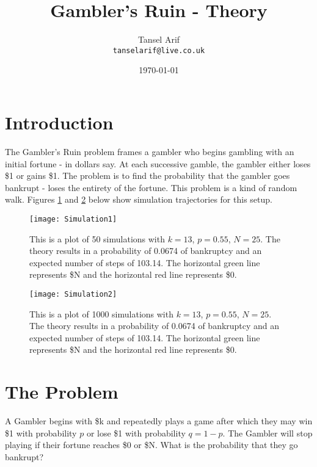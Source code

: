 \documentclass{article}
\title{Gambler's Ruin - Theory} %
\author{Tansel Arif\\ \texttt{tanselarif@live.co.uk}} %
\date{\today} %
\begin{document}
\maketitle %


\section*{Introduction} %

The Gambler's Ruin problem frames a gambler who begins gambling with an initial fortune - in dollars say. At each successive gamble, the gambler either loses \$1 or gains \$1. The problem is to find the probability that the gambler goes bankrupt - loses the entirety of the fortune. This problem is a kind of random walk. Figures \ref{fig:sim1} and \ref{fig:sim2} below show simulation trajectories for this setup.

\begin{figure}[r]
    \centering
    \texttt{[image: Simulation1]}
    \caption{This is a plot of 50 simulations with $k = 13$, $p = 0.55$, $N = 25$. The theory results in a probability of 0.0674 of bankruptcy and an expected number of steps of 103.14. The horizontal green line represents \$N and the horizontal red line represents \$0.}
    \label{fig:sim1}
\end{figure}

\begin{figure}[r]
    \centering
    \texttt{[image: Simulation2]}
    \caption{This is a plot of 1000 simulations with $k = 13$, $p = 0.55$, $N = 25$. The theory results in a probability of 0.0674 of bankruptcy and an expected number of steps of 103.14. The horizontal green line represents \$N and the horizontal red line represents \$0.}
    \label{fig:sim2}
\end{figure}

\section{The Problem} %

A Gambler begins with \$k and repeatedly plays a game after which they may win \$1 with probability $p$ or lose \$1 with probability $q=1-p$. The Gambler will stop playing if their fortune reaches \$0 or \$N. What is the probability that they go bankrupt?
\end{document}

